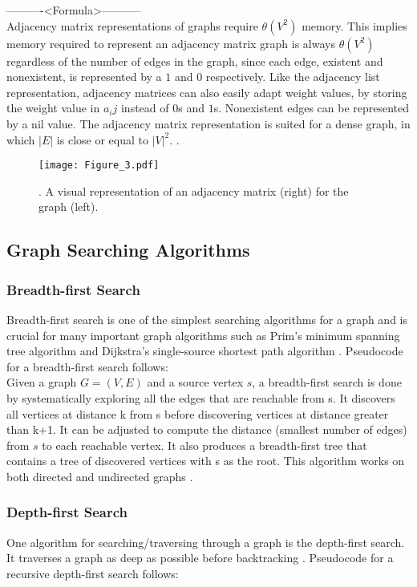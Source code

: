 \documentclass[10pt,11pt,12pt,oneside]{book}
\begin{document}
	----------<Formula>-----------\\
	Adjacency matrix representations of graphs require  $\theta(V^{2})$ memory. This implies memory required to represent an adjacency matrix graph is always $\theta(V^{2})$ regardless of the number of edges in the graph, since each edge, existent and nonexistent, is represented by a $1$ and $0$ respectively. Like the adjacency list representation, adjacency matrices can also easily adapt weight values, by storing the weight value in $a_ij$ instead of $0$s and $1$s. Nonexistent edges can be represented by a nil value. The adjacency matrix representation is suited for a dense graph, in which $|E|$ is close or equal to $|V|^{2}$. \cite{beel2016paper}.\\
	
	\begin{figure}[!htb]
		\centering
		\texttt{[image: Figure\_3.pdf]}
		\caption{. A visual representation of an adjacency matrix (right) for the graph (left).}
		\label{fig:adjacency_matrix}
	\end{figure}
	
	\subsection{Graph Searching Algorithms}
	\subsubsection{Breadth-first Search}
	Breadth-first search is one of the simplest searching algorithms for a graph and is crucial for many important graph algorithms such as Prim’s minimum spanning tree algorithm and Dijkstra’s single-source shortest path algorithm \cite{beel2016paper}. Pseudocode for a breadth-first search follows:\\
	
	Given a graph $G = (V, E)$ and a source vertex $s$, a breadth-first search is done by systematically exploring all the edges that are reachable from s. It discovers all vertices at distance k from s before discovering vertices at distance greater than k+1. It can be adjusted to compute the distance (smallest number of edges) from $s$ to each reachable vertex. It also produces a breadth-first tree that contains a tree of discovered vertices with s as the root. This algorithm works on both directed and undirected graphs \cite{beel2016paper}. 
	
	\subsubsection{Depth-first Search}
	One algorithm for searching/traversing through a graph is the depth-first search. It traverses a graph as deep as possible before backtracking \cite{beel2016paper}. Pseudocode for a recursive depth-first search follows:\\
	
\end{document}
